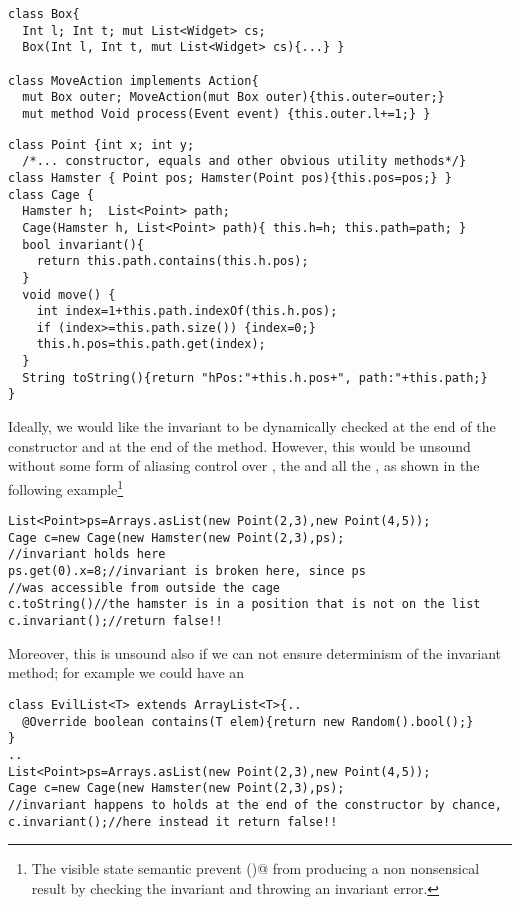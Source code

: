 \begin{lstlisting}
class Box{
  Int l; Int t; mut List<Widget> cs;
  Box(Int l, Int t, mut List<Widget> cs){...} }

class MoveAction implements Action{
  mut Box outer; MoveAction(mut Box outer){this.outer=outer;}
  mut method Void process(Event event) {this.outer.l+=1;} }
\end{lstlisting}

\begin{lstlisting}
class Point {int x; int y;
  /*... constructor, equals and other obvious utility methods*/}
class Hamster { Point pos; Hamster(Point pos){this.pos=pos;} }
class Cage {
  Hamster h;  List<Point> path;
  Cage(Hamster h, List<Point> path){ this.h=h; this.path=path; }
  bool invariant(){
    return this.path.contains(this.h.pos);
  }
  void move() {
    int index=1+this.path.indexOf(this.h.pos);
    if (index>=this.path.size()) {index=0;}
    this.h.pos=this.path.get(index);
  }
  String toString(){return "hPos:"+this.h.pos+", path:"+this.path;}
}
\end{lstlisting}
\LINE
Ideally, we would like the invariant to be dynamically checked 
at the end of the constructor and at the end of the \Q@move@ method.
However, this would be unsound without some form of aliasing control over \Q@Hamster@,
the \Q@List@ and all the \Q@Point@s, as shown in the following example\footnote{
The visible state semantic prevent \Q@toString()@ from producing a non nonsensical result
by checking the invariant and throwing an invariant error.
}
\begin{lstlisting}
List<Point>ps=Arrays.asList(new Point(2,3),new Point(4,5));
Cage c=new Cage(new Hamster(new Point(2,3),ps);
//invariant holds here
ps.get(0).x=8;//invariant is broken here, since ps
//was accessible from outside the cage
c.toString()//the hamster is in a position that is not on the list
c.invariant();//return false!!
\end{lstlisting}

Moreover, this is unsound also if we can not ensure determinism of the invariant method;
for example we could have an \Q@EvilList@

\begin{lstlisting}
class EvilList<T> extends ArrayList<T>{..
  @Override boolean contains(T elem){return new Random().bool();}
}
..
List<Point>ps=Arrays.asList(new Point(2,3),new Point(4,5));
Cage c=new Cage(new Hamster(new Point(2,3),ps);
//invariant happens to holds at the end of the constructor by chance,
c.invariant();//here instead it return false!!
\end{lstlisting}


